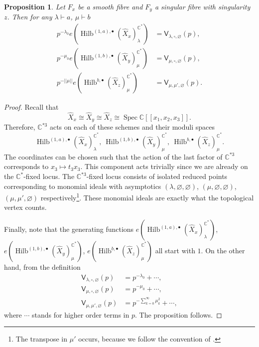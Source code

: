 \documentclass{amsart}
\newtheorem{proposition}[theorem]{Proposition}
\theoremstyle{definition}
\newcommand{\CC} {\mathbb{C}}          %
\newcommand{\sfV}{\mathsf{V}}
\newcommand{\Hilb}{\operatorname{Hilb}}
\newcommand{\Spec}{\operatorname{Spec}}
\begin{document}
\begin{proposition} \label{vertex1}
Let $F_x$ be a smooth fibre and $F_y$ a singular fibre with singularity $z$. Then for any $\lambda \vdash a$, $\mu \vdash b$
\begin{align*}
p^{-\lambda_0} e(\Hilb^{(1,a),\bullet}(\widehat{X}_x)_{\lambda}^{\CC^*}) &= \sfV_{\lambda,\square,\varnothing}(p), \\
p^{-\mu_0} e(\Hilb^{(1,b),\bullet}(\widehat{X}_y)_{\mu}^{\CC^*}) &= \sfV_{\mu,\square,\varnothing}(p), \\
p^{-|\!|\mu|\!|} e(\Hilb^{b,\bullet}(\widehat{X}_z)_{\mu}^{\CC^*}) &= \sfV_{\mu,\mu',\varnothing}(p).
\end{align*}
\end{proposition}
\begin{proof}
Recall that $$\widehat{X}_x \cong \widehat{X}_y \cong \widehat{X}_z \cong \Spec \CC[\![x_1,x_2,x_3]\!].$$ Therefore, $\CC^{*3}$ acts on each of these schemes and their moduli spaces 
$$
\Hilb^{(1,a),\bullet}(\widehat{X}_x)_{\lambda}^{\CC^*}, \ \Hilb^{(1,b),\bullet}(\widehat{X}_y)_{\mu}^{\CC^*}, \ \Hilb^{b,\bullet}(\widehat{X}_z)_{\mu}^{\CC^*}.
$$
The coordinates can be chosen such that the action of the last factor of $\CC^{*3}$ corresponds to $x_3 \mapsto t_3 x_3$. This component acts trivially since we are already on the $\CC^*$-fixed locus. The $\CC^{*3}$-fixed locus consists of isolated reduced points corresponding to monomial ideals with asymptotics $(\lambda,\varnothing,\varnothing)$, $(\mu,\varnothing,\varnothing)$, $(\mu,\mu',\varnothing)$ respectively\footnote{The transpose in $\mu'$ occurs, because we follow the convention of \cite{ORV}.}. These monomial ideals are exactly what the topological vertex counts. 

Finally, note that the generating functions $e(\Hilb^{(1,a),\bullet}(\widehat{X}_x)_{\lambda}^{\CC^*})$, $e(\Hilb^{(1,b),\bullet}(\widehat{X}_y)_{\mu}^{\CC^*})$, $e(\Hilb^{b,\bullet}(\widehat{X}_z)_{\mu}^{\CC^*})$ all start with $1$. On the other hand, from the definition
\begin{align*}
\sfV_{\lambda,\square,\varnothing}(p) &= p^{-\lambda_0} + \cdots, \\
\sfV_{\mu,\square,\varnothing}(p) &= p^{-\mu_0} + \cdots, \\
\sfV_{\mu,\mu',\varnothing}(p) &= p^{-\sum_{k=0}^{\infty} \mu_{k}^{2}} + \cdots,
\end{align*}
where $\cdots$ stands for higher order terms in $p$. The proposition follows.
\end{proof}
\end{document}
